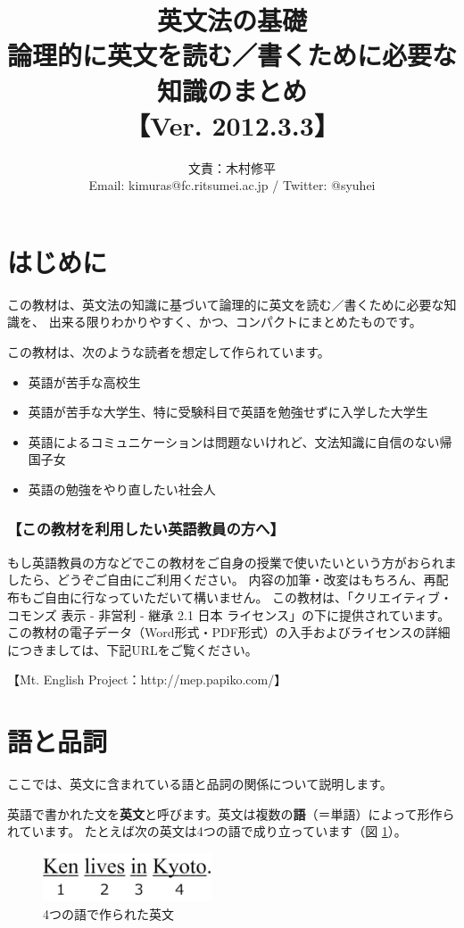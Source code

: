 \documentclass[12pt,titlepage]{jsarticle}
\title{英文法の基礎\\ 論理的に英文を読む／書くために必要な知識のまとめ\\【Ver. 2012.3.3】}
\author{文責：木村修平\\Email: kimuras@fc.ritsumei.ac.jp / Twitter: @syuhei}
\begin{document}
\maketitle
\tableofcontents

\newpage


\setcounter{section}{-1}
 \section{はじめに}
 この教材は、英文法の知識に基づいて論理的に英文を読む／書くために必要な知識を、
 出来る限りわかりやすく、かつ、コンパクトにまとめたものです。

 この教材は、次のような読者を想定して作られています。
 \begin{itemize}
  \item 英語が苦手な高校生
  \item 英語が苦手な大学生、特に受験科目で英語を勉強せずに入学した大学生
  \item 英語によるコミュニケーションは問題ないけれど、文法知識に自信のない帰国子女
  \item 英語の勉強をやり直したい社会人
 \end{itemize}

   \subsubsection*{【この教材を利用したい英語教員の方へ】}
   もし英語教員の方などでこの教材をご自身の授業で使いたいという方がおられましたら、どうぞご自由にご利用ください。
   内容の加筆・改変はもちろん、再配布もご自由に行なっていただいて構いません。
   この教材は、「クリエイティブ・コモンズ 表示 - 非営利 - 継承 2.1 日本 ライセンス」の下に提供されています。
   この教材の電子データ（Word形式・PDF形式）の入手およびライセンスの詳細につきましては、下記URLをご覧ください。

   【Mt. English Project：http://mep.papiko.com/】


 \section{語と品詞}
 ここでは、英文に含まれている語と品詞の関係について説明します。
 
 英語で書かれた文を{\bf 英文}と呼びます。英文は複数の{\bf 語}（＝単語）によって形作られています。
 たとえば次の英文は4つの語で成り立っています（図 \ref{fig1}）。

 
 \begin{figure}[htbp]
  \begin{center}
   \includegraphics[width=5cm]{./figure/fig1.pdf}
   \caption{4つの語で作られた英文}
   \label{fig1}
  \end{center}
 \end{figure}
 
\end{document}
